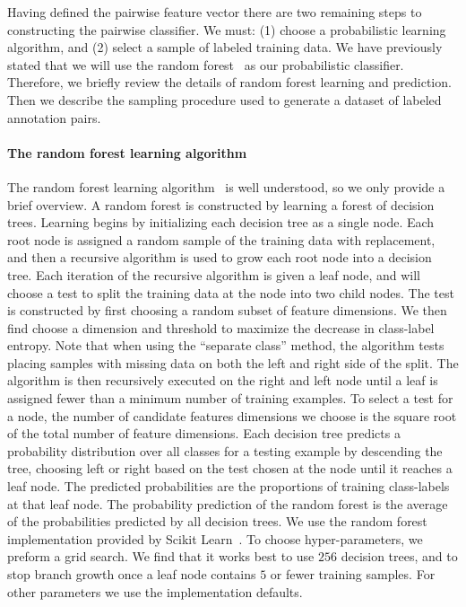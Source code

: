     Having defined the pairwise feature vector there are two remaining steps to constructing the pairwise
      classifier.
    We must:
    (1) choose a probabilistic learning algorithm, and
    (2) select a sample of labeled training data.
    We have previously stated that we will use the random forest~\cite{breiman_random_2001} as our probabilistic
      classifier.
    Therefore, we briefly review the details of random forest learning and prediction.
    Then we describe the sampling procedure used to generate a dataset of labeled annotation pairs.

    \paragraph{The random forest learning algorithm}
    The random forest learning algorithm~\cite{breiman_random_2001} is well understood, so we only provide a
      brief overview.
    A random forest is constructed by learning a forest of decision trees.
    Learning begins by initializing each decision tree as a single node.
    Each root node is assigned a random sample of the training data with replacement, and then a recursive
      algorithm is used to grow each root node into a decision tree.
    Each iteration of the recursive algorithm is given a leaf node, and will choose a test to split the training
      data at the node into two child nodes.
    The test is constructed by first choosing a random subset of feature dimensions.
    We then find choose a dimension and threshold to maximize the decrease in class-label entropy.
    Note that when using the ``separate class'' method, the algorithm tests placing samples with missing data on
      both the left and right side of the split.
    The algorithm is then recursively executed on the right and left node until a leaf is assigned fewer than a
      minimum number of training examples.
    To select a test for a node, the number of candidate features dimensions we choose is the square root of the
      total number of feature dimensions.
    Each decision tree predicts a probability distribution over all classes for a testing example by descending
      the tree, choosing left or right based on the test chosen at the node until it reaches a leaf node.
    The predicted probabilities are the proportions of training class-labels at that leaf node.
    The probability prediction of the random forest is the average of the probabilities predicted by all decision
      trees.
    We use the random forest implementation provided by Scikit Learn~\cite{pedregosa_scikit_learn_2011}.
    To choose hyper-parameters, we preform a grid search.
    We find that it works best to use $256$ decision trees, and to stop branch growth once a leaf node contains
      $5$ or fewer training samples.
    For other parameters we use the implementation defaults.

